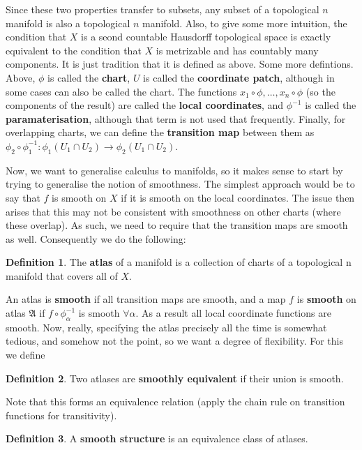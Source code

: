 \documentclass{article}
\theoremstyle{definition}
\newtheorem{definition}{Definition}
\begin{document}
Since these two properties transfer to subsets, any subset of a topological $n$
manifold is also a topological $n$ manifold. Also, to give some more intuition,
the condition that $X$ is a seond countable Hausdorff topological space is
exactly equivalent to the condition that $X$ is metrizable and has countably
many components. It is just tradition that it is defined as above. Some more
defintions. Above, $\phi$ is called the \textbf{chart}, $U$ is called the
\textbf{coordinate patch}, although in some cases can also be called the chart.
The functions $x_1 \circ \phi, \dots, x_n \circ \phi$ (so the components of
the result) are called the \textbf{local coordinates}, and $\phi^{-1}$ is called
the \textbf{paramaterisation}, although that term is not used that frequently.
Finally, for overlapping charts, we can define the \textbf{transition map}
between them as $\phi_2 \circ \phi_1^{-1} : \phi_1 (U_1 \cap U_2) \to \phi_2(U_1
\cap U_2)$.

Now, we want to generalise calculus to manifolds, so it makes sense to start by
trying to generalise the notion of smoothness. The simplest approach would be to
say that $f$ is smooth on $X$ if it is smooth on the local coordinates. The
issue then arises that this may not be consistent with smoothness on other
charts (where these overlap). As such, we need to require that the transition
maps are smooth as well. Consequently we do the following:

\begin{definition}
  The \textbf{atlas} of a manifold is a collection of charts of a topological
  n manifold that covers all of $X$.
\end{definition}

An atlas is \textbf{smooth} if all transition maps are smooth, and a map $f$ is
\textbf{smooth} on atlas $\mathfrak{A}$ if $f \circ \phi_\alpha^{-1}$ is smooth
$\forall \alpha$. As a result all local coordinate functions are smooth. Now,
really, specifying the atlas precisely all the time is somewhat tedious, and
somehow not the point, so we want a degree of flexibility. For this we define

\begin{definition}
  Two atlases are \textbf{smoothly equivalent} if their union is smooth.
\end{definition}

Note that this forms an equivalence relation (apply the chain rule on transition
functions for transitivity).

\begin{definition}
  A \textbf{smooth structure} is an equivalence class of atlases.
\end{definition}
\end{document}

